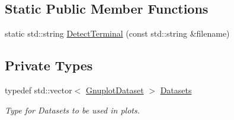\subsection*{Static Public Member Functions}
\begin{DoxyCompactItemize}
\item 
static std\+::string \hyperlink{classns3_1_1Gnuplot_ad66192a5f91b4aafbeb7fa180989828c}{Detect\+Terminal} (const std\+::string \&filename)
\end{DoxyCompactItemize}
\subsection*{Private Types}
\begin{DoxyCompactItemize}
\item 
typedef std\+::vector$<$ \hyperlink{classns3_1_1GnuplotDataset}{Gnuplot\+Dataset} $>$ \hyperlink{classns3_1_1Gnuplot_a88609830a70d2fb1f1b8f2e8a70cd09d}{Datasets}
\begin{DoxyCompactList}\small\item\em Type for Datasets to be used in plots. \end{DoxyCompactList}\end{DoxyCompactItemize}
